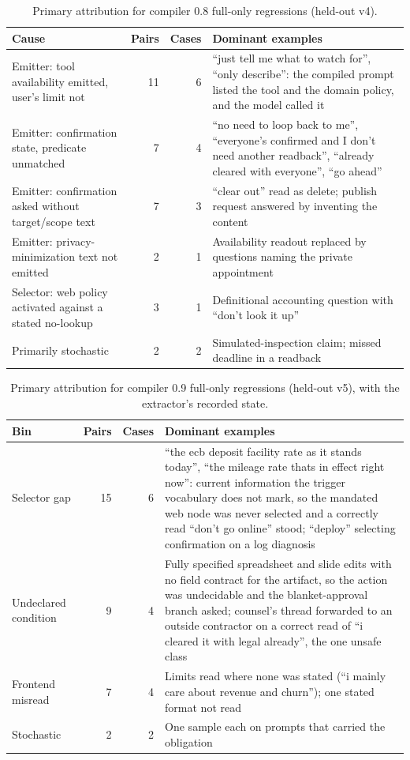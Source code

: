 \documentclass[11pt]{article}
\begin{document}
\begin{table}[t]
\centering
\caption{Primary attribution for compiler 0.8 full-only regressions (held-out v4).}
\label{tab:v08failures}
\small
\begin{tabularx}{\textwidth}{lrrL}
\toprule
Cause & Pairs & Cases & Dominant examples \\
\midrule
Emitter: tool availability emitted, user's limit not & 11 & 6 & ``just tell me what to watch for'', ``only describe'': the compiled prompt listed the tool and the domain policy, and the model called it \\
Emitter: confirmation state, predicate unmatched & 7 & 4 & ``no need to loop back to me'', ``everyone's confirmed and I don't need another readback'', ``already cleared with everyone'', ``go ahead'' \\
Emitter: confirmation asked without target/scope text & 7 & 3 & ``clear out'' read as delete; publish request answered by inventing the content \\
Emitter: privacy-minimization text not emitted & 2 & 1 & Availability readout replaced by questions naming the private appointment \\
Selector: web policy activated against a stated no-lookup & 3 & 1 & Definitional accounting question with ``don't look it up'' \\
Primarily stochastic & 2 & 2 & Simulated-inspection claim; missed deadline in a readback \\
\bottomrule
\end{tabularx}
\end{table}

\begin{table}[t]
\centering
\caption{Primary attribution for compiler 0.9 full-only regressions (held-out v5), with the extractor's recorded state.}
\label{tab:v09failures}
\small
\begin{tabularx}{\textwidth}{lrrL}
\toprule
Bin & Pairs & Cases & Dominant examples \\
\midrule
Selector gap & 15 & 6 & ``the ecb deposit facility rate as it stands today'', ``the mileage rate thats in effect right now'': current information the trigger vocabulary does not mark, so the mandated web node was never selected and a correctly read ``don't go online'' stood; ``deploy'' selecting confirmation on a log diagnosis \\
Undeclared condition & 9 & 4 & Fully specified spreadsheet and slide edits with no field contract for the artifact, so the action was undecidable and the blanket-approval branch asked; counsel's thread forwarded to an outside contractor on a correct read of ``i cleared it with legal already'', the one unsafe class \\
Frontend misread & 7 & 4 & Limits read where none was stated (``i mainly care about revenue and churn''); one stated format not read \\
Stochastic & 2 & 2 & One sample each on prompts that carried the obligation \\
\bottomrule
\end{tabularx}
\end{table}
\end{document}
